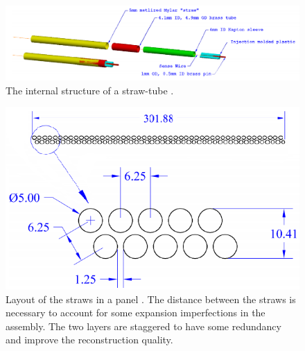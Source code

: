 \documentclass[12pt,a4paper,openright, oneside, titlepage]{book} %
\begin{document}
\begin{figure}[h!]
\centering
\includegraphics[scale=0.4]{straw}
\caption[Structure of a straw-tube]{The internal structure of a straw-tube \cite{MTDR}.}
\label{_straw}
\end{figure}

\begin{figure}[h!]
\centering
\includegraphics[scale=0.8]{Tracker_panel_geom}
\caption[Layout of straws in a panel]{Layout of the straws in a panel \cite{MTDR}. 
The distance between the straws is necessary to account for some expansion imperfections in the assembly. 
The two layers are staggered to have some redundancy and improve the reconstruction quality.}
\label{_Tracker_panel_geom}
\end{figure}
\end{document}
